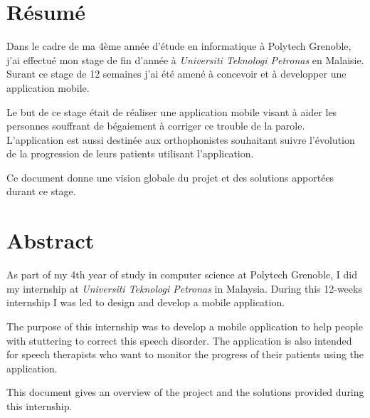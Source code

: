 \chapter*{Résumé}
Dans le cadre de ma 4ème année d'étude en informatique à Polytech Grenoble, j'ai effectué mon stage de fin d'année à \textit{Universiti Teknologi Petronas} en Malaisie. Surant ce stage de 12 semaines j'ai été amené à concevoir et à developper une application mobile.

Le but de ce stage était de réaliser une application mobile visant à aider les personnes souffrant de bégaiement à corriger ce trouble de la parole. L'application est aussi destinée aux orthophonistes souhaitant suivre l'évolution de la progression de leurs patients utilisant l'application.

Ce document donne une vision globale du projet et des solutions apportées durant ce stage.

\vspace{4cm}

\begingroup
\let\clearpage\relax
\chapter*{Abstract}
\endgroup

As part of my 4th year of study in computer science at Polytech Grenoble, I did my internship at \textit{Universiti Teknologi Petronas} in Malaysia. During this 12-weeks internship I was led to design and develop a mobile application.

The purpose of this internship was to develop a mobile application to help people with stuttering to correct this speech disorder. The application is also intended for speech therapists who want to monitor the progress of their patients using the application.

This document gives an overview of the project and the solutions provided during this internship.
